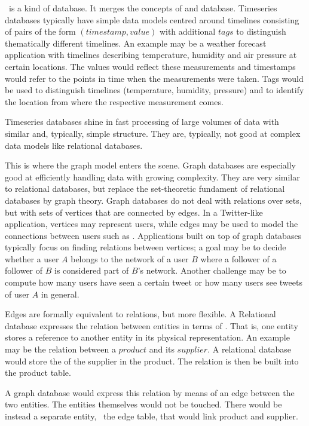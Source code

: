 \nowdb\ is a kind of database.
It merges the concepts
of  and  database.
Timeseries databases typically have simple
data models centred around timelines
consisting of pairs of the form
$(timestamp,value)$
with additional $tags$ to
distinguish thematically different timelines.
An example may be a weather forecast
application with timelines describing
temperature, humidity and air pressure
at certain locations. The values would
reflect these measurements and timestamps
would refer to the points in time when
the measurements were taken. Tags would
be used to distinguish timelines
(temperature, humidity, pressure) and
to identify the location from where the
respective measurement comes.

Timeseries databases shine in 
fast processing of large volumes of
data with similar and, typically, simple structure.
They are, typically, not good at complex
data models like relational databases.

This is where the graph model enters the scene.
Graph databases are especially good
at efficiently handling
data with growing complexity.
They are very similar to relational
databases, but replace the set-theoretic
fundament of relational databases by
graph theory. Graph databases do not deal
with relations over sets, but with
sets of vertices that are connected
by edges. In a Twitter-like application,
vertices may represent users, while
edges may be used to model
the connections between users such as
.
Applications built on top of graph databases
typically focus on finding relations
between vertices; a goal may be to decide
whether a user $A$ belongs to the network
of a user $B$ where a follower of a
follower of $B$ is considered part of
$B$'s network. Another challenge may be
to compute how many users have seen
a certain tweet or how many users
see tweets of user $A$ in general.

Edges are formally equivalent to relations,
but more flexible. A Relational database
expresses the relation between entities
in terms of .
That is, one entity stores a reference
to another entity in its physical
representation.
An example may be the relation
between a $product$ and its $supplier$.
A relational database would store
the  of the supplier
in the product.
The relation is then be built into
the product table.

A graph database would express this relation
by means of an edge between the two entities.
The entities themselves would not be touched.
There would be instead a separate entity,
\viz\ the edge table, that would link
product and supplier.


